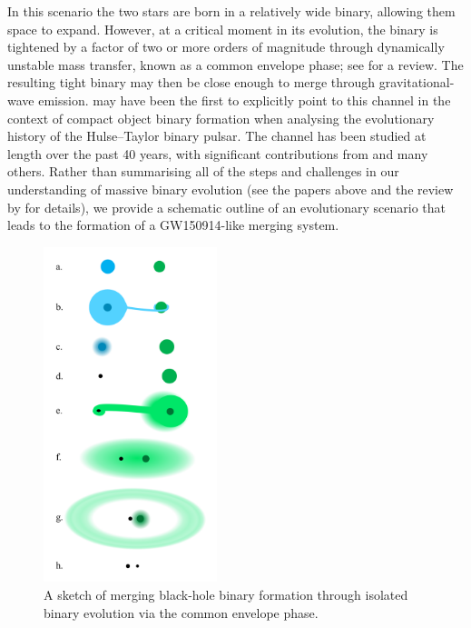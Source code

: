 \documentclass[review]{elsarticle}
\begin{document}
In this scenario the two stars are born in a relatively wide binary, allowing them space to expand.  However, at a critical moment in its evolution, the binary is tightened by a factor of two or more orders of magnitude through dynamically unstable mass transfer, known as a common envelope phase; see \citet{Ivanova:2013} for a review. The resulting tight binary may then be close enough to merge through gravitational-wave emission.  \citet{SmarrBlandford:1976} may have been the first to explicitly point to this channel in the context of compact object binary formation when analysing the evolutionary history of the Hulse--Taylor binary pulsar. The channel has been studied at length over the past 40 years, with significant contributions from \citet{TutukovYungelson:1993,Lipunov:1997,BetheBrown:1998,Nelemans:2001,VossTauris:2003,Pfahl:2005,Dewi:2006,Kalogera:2007,OShaughnessy:2008,Dominik:2012,Belczynski:2016,EldridgeStanway:2016} and many others. Rather than summarising all of the steps and challenges in our understanding of massive binary evolution (see the papers above and the review by \citet{PostnovYungelson:2014} for details), we provide a schematic outline of an evolutionary scenario that leads to the formation of a GW150914-like merging system.

\begin{figure}
	\centering
	\includegraphics[width=0.45\textwidth]{channel1.png}
	\caption{\label{fig:isol_binary} A sketch of merging black-hole binary formation through isolated binary evolution via the common envelope phase.}
\end{figure}
\end{document}
